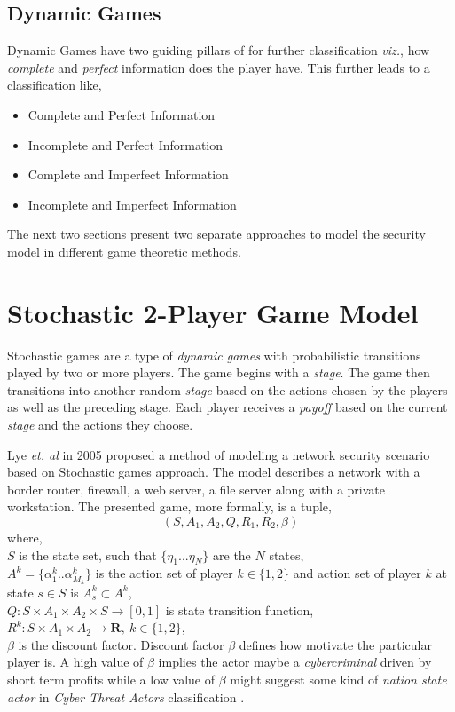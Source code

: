 \documentclass[conference]{IEEEtran}
\begin{document}
\subsection*{Dynamic Games}
Dynamic Games have two guiding pillars of for further classification \textit{viz.}, how \textit{complete} and \textit{perfect} information does the player have.
This further leads to a classification like,
\begin{itemize}
    \item Complete and Perfect Information
    \item Incomplete and Perfect Information
    \item Complete and Imperfect Information
    \item Incomplete and Imperfect Information
\end{itemize}

The next two sections present two separate approaches to model the security model in different game theoretic methods.

\section*{Stochastic 2-Player Game Model}
Stochastic games \cite{wiki-stochastic} are a type of \textit{dynamic games} with probabilistic transitions played by two or more players.
The game begins with a \textit{stage}.
The game then transitions into another random \textit{stage} based on the actions chosen by the players as well as the preceding stage.
Each player receives a \textit{payoff} based on the current \textit{stage} and the actions they choose.

Lye \textit{et. al} \cite{stochastic} in 2005 proposed a method of modeling a network security scenario based on Stochastic games approach.
The model describes a network with a border router, firewall, a web server, a file server along with a private workstation.
The presented game, more formally, is a tuple,
\begin{equation} \label{sto_tup}
    (S, A_{1}, A_{2}, Q, R_{1}, R_{2}, \beta)
\end{equation}
where,\\
$S$ is the state set, such that $ \{\eta_{1}...\eta_{N}\}$ are the $N$ states,\\
$A^{k} = \{\alpha^{k}_{1}..\alpha^{k}_{M_{k}}\}$ is the action set of player $ k \in \{1, 2\}$ and action set of player $k$ at state $s\in S$ is $A^{k}_{s} \subset A^{k}$,\\
$Q: S\times A_{1} \times A_{2} \times S \rightarrow [0,1]$ is state transition function,\\
$R^{k}: S\times A_{1} \times A_{2} \rightarrow \mathbf{R},\ k \in \{1,2\}$,\\
$\beta$ is the discount factor.
Discount factor $\beta$ defines how motivate the particular player is.
A high value of $\beta$ implies the actor maybe a \textit{cybercriminal} driven by short term profits while a low value of $\beta$ might suggest some kind of \textit{nation state actor} in \textit{Cyber Threat Actors} classification \cite{cyberactor}.
\end{document}
